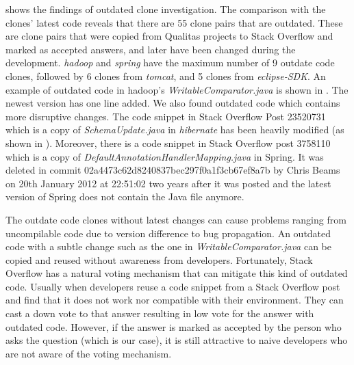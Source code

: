 \documentclass{sig-alternate-05-2015}
\begin{document}
 shows the findings of outdated clone investigation. The comparison with the clones' latest code reveals that there are 55 clone pairs that are outdated. These are clone pairs that were copied from Qualitas projects to Stack Overflow and marked as accepted answers, and later have been changed during the development. \textit{hadoop} and \textit{spring} have the maximum number of 9 outdate code clones, followed by 6 clones from \textit{tomcat}, and 5 clones from \textit{eclipse-SDK}. An example of outdated code in hadoop's \textit{WritableComparator.java} is shown in . The newest version has one line added. We also found outdated code which contains more disruptive changes. The code snippet in Stack Overflow Post 23520731 which is a copy of \textit{SchemaUpdate.java} in \textit{hibernate} has been heavily modified (as shown in ). Moreover, there is a code snippet in Stack Overflow post 3758110 which is a copy of \textit{DefaultAnnotationHandlerMapping.java} in Spring. It was deleted in commit 02a4473c62d8240837bec297f0a1f3cb67ef8a7b by Chris Beams on 20th January 2012 at 22:51:02 two years after it was posted and the latest version of Spring does not contain the Java file anymore. 

The outdate code clones without latest changes can cause problems ranging from uncompilable code due to version difference to bug propagation. An outdated code with a subtle change such as the one in \textit{WritableComparator.java} can be copied and reused without awareness from developers. Fortunately, Stack Overflow has a natural voting mechanism that can mitigate this kind of outdated code. Usually when developers reuse a code snippet from a Stack Overflow post and find that it does not work nor compatible with their environment. They can cast a down vote to that answer resulting in low vote for the answer with outdated code. However, if the answer is marked as accepted by the person who asks the question (which is our case), it is still attractive to naive developers who are not aware of the voting mechanism. 
\end{document}
